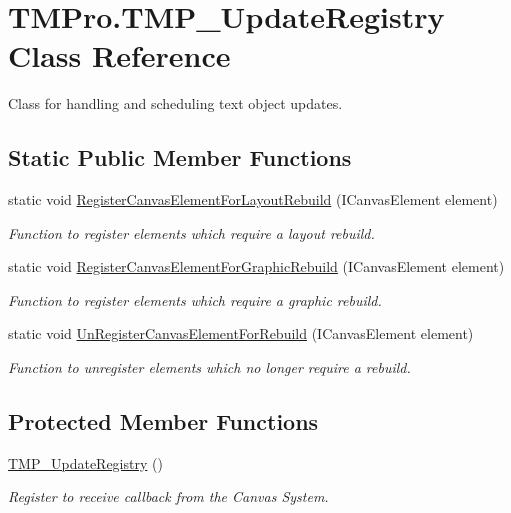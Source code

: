 \hypertarget{class_t_m_pro_1_1_t_m_p___update_registry}{}\section{T\+M\+Pro.\+T\+M\+P\+\_\+\+Update\+Registry Class Reference}
\label{class_t_m_pro_1_1_t_m_p___update_registry}


Class for handling and scheduling text object updates.  


\subsection*{Static Public Member Functions}
\begin{DoxyCompactItemize}
\item 
static void \mbox{\hyperlink{class_t_m_pro_1_1_t_m_p___update_registry_af6cca1c5d46be0cb39cf1fc822a7ef1b}{Register\+Canvas\+Element\+For\+Layout\+Rebuild}} (I\+Canvas\+Element element)
\begin{DoxyCompactList}\small\item\em Function to register elements which require a layout rebuild. \end{DoxyCompactList}\item 
static void \mbox{\hyperlink{class_t_m_pro_1_1_t_m_p___update_registry_ac449cc7e45976566e6420c763ab8c5af}{Register\+Canvas\+Element\+For\+Graphic\+Rebuild}} (I\+Canvas\+Element element)
\begin{DoxyCompactList}\small\item\em Function to register elements which require a graphic rebuild. \end{DoxyCompactList}\item 
static void \mbox{\hyperlink{class_t_m_pro_1_1_t_m_p___update_registry_abdd464c5a6919c3383c4d8fa19fe60df}{Un\+Register\+Canvas\+Element\+For\+Rebuild}} (I\+Canvas\+Element element)
\begin{DoxyCompactList}\small\item\em Function to unregister elements which no longer require a rebuild. \end{DoxyCompactList}\end{DoxyCompactItemize}
\subsection*{Protected Member Functions}
\begin{DoxyCompactItemize}
\item 
\mbox{\hyperlink{class_t_m_pro_1_1_t_m_p___update_registry_ace9d173b85d91abac839f7fb70b73b9f}{T\+M\+P\+\_\+\+Update\+Registry}} ()
\begin{DoxyCompactList}\small\item\em Register to receive callback from the Canvas System. \end{DoxyCompactList}\end{DoxyCompactItemize}
